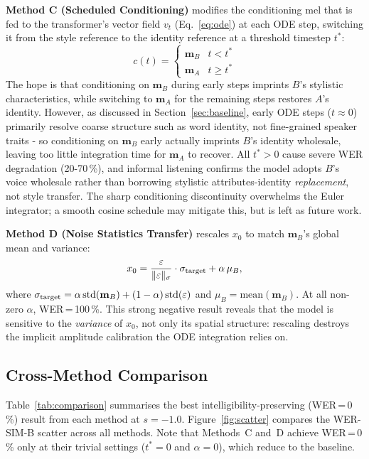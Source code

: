 \documentclass[11pt,a4paper,twocolumn]{article}
\begin{document}
\textbf{Method C (Scheduled Conditioning)} modifies the conditioning mel
that is fed to the transformer's vector field $v_t$
(Eq.~\ref{eq:ode}) at each ODE step, switching it from the style
reference to the identity reference at a threshold timestep $t^*$:
\begin{equation}
  c(t) = \begin{cases} \mathbf{m}_B & t < t^* \\ \mathbf{m}_A & t \geq t^* \end{cases}
  \label{eq:methc}
\end{equation}
The hope is that conditioning on $\mathbf{m}_B$ during early steps
imprints $B$'s stylistic characteristics, while switching to
$\mathbf{m}_A$ for the remaining steps restores $A$'s identity.
However, as discussed in Section~\ref{sec:baseline}, early ODE steps
($t\approx 0$) primarily resolve coarse structure such as word
identity, not fine-grained speaker traits - so conditioning on
$\mathbf{m}_B$ early actually imprints $B$'s identity wholesale,
leaving too little integration time for $\mathbf{m}_A$ to recover.
All $t^*>0$ cause severe WER degradation
(20-70\,\%), and informal listening confirms the model adopts $B$'s voice
wholesale rather than borrowing stylistic attributes-identity
\emph{replacement}, not style transfer.  The sharp conditioning discontinuity
overwhelms the Euler integrator; a smooth cosine schedule may mitigate this, but is left as future work.

\textbf{Method D (Noise Statistics Transfer)} rescales $x_0$ to match
$\mathbf{m}_B$'s global mean and variance:
\begin{equation}
  x_0 = \frac{\varepsilon}{\|\varepsilon\|_\sigma}\cdot\sigma_{\rm target}
        + \alpha\,\mu_B,
  \label{eq:methd}
\end{equation}
where $\sigma_{\rm target} = \alpha\,\text{std}(\mathbf{m}_B)
+ (1-\alpha)\,\text{std}(\varepsilon)$ and $\mu_B = \text{mean}(\mathbf{m}_B)$.
At all non-zero $\alpha$, WER\,=\,100\,\%.  This strong negative result
reveals that the model is sensitive to the \emph{variance} of $x_0$, not
only its spatial structure: rescaling destroys the implicit amplitude
calibration the ODE integration relies on.

\subsection{Cross-Method Comparison}
\label{sec:comparison}

Table~\ref{tab:comparison} summarises the best intelligibility-preserving
(WER\,=\,0\,\%) result from each method at $s=-1.0$.  Figure~\ref{fig:scatter}
compares the WER-SIM-B scatter across all methods.  Note that Methods~C
and~D achieve WER\,=\,0\,\% only at their trivial settings ($t^*{=}0$ and
$\alpha{=}0$), which reduce to the baseline.
\end{document}
